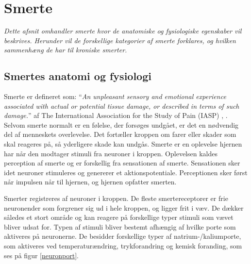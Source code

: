 \section{Smerte}
\textit{Dette afsnit omhandler smerte hvor de anatomiske og fysiologiske egenskaber vil beskrives. Herunder vil de forskellige kategorier af smerte forklares, og hvilken sammenhæng de har til kroniske smerter.}

\subsection{Smertes anatomi og fysiologi}
Smerte er defineret som: “\textit{An unpleasant sensory and emotional experience associated with actual or potential tissue damage, or described in terms of such damage.}” af The International Association for the Study of Pain (IASP) \citep{Giangregorio1997}, \citep{Carmon}.\\
Selvom smerte normalt er en følelse, der forsøges undgået, er det en nødvendig del af menneskets overlevelse. Det fortæller kroppen om farer eller skader som skal reageres på, så yderligere skade kan undgås.
Smerte er en oplevelse hjernen har når den modtager stimuli fra neuroner i kroppen. Oplevelsen kaldes perception af smerte og er forskellig fra sensationen af smerte. Sensationen sker idet neuroner stimuleres og genererer et aktionspotentiale. Perceptionen sker først når impulsen når til hjernen, og hjernen opfatter smerten. 


Smerter registreres af neuroner i kroppen. De fleste smertereceptorer er frie neuronender som forgrener sig ud i hele kroppen, og ligger frit i væv. De dækker således et stort område og kan reagere på forskellige typer stimuli som vævet bliver udsat for. Typen af stimuli bliver bestemt afhængig af hvilke porte som aktiveres på neuronerne. De besidder forskellige typer af natrium-/kaliumporte, som aktiveres ved temperaturændring, trykforandring og kemisk foranding, som ses på figur \ref{neuronport}.

